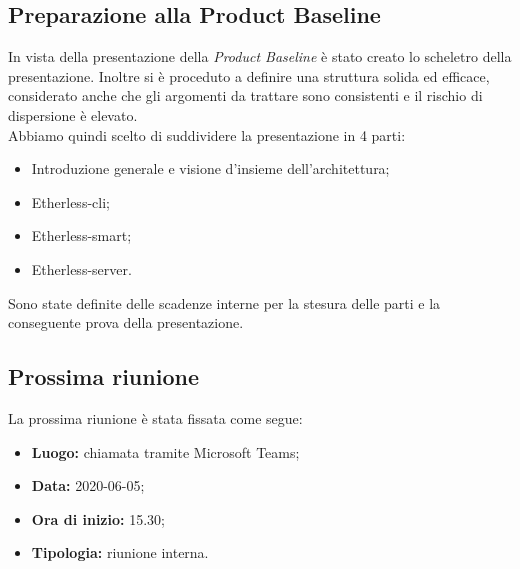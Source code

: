 	\subsection{Preparazione alla Product Baseline}
		In vista della presentazione della \textit{Product Baseline} è stato creato lo scheletro della presentazione. Inoltre si è proceduto a definire una struttura solida ed efficace, considerato anche che gli argomenti da trattare sono consistenti e il rischio di dispersione è elevato.\\
		Abbiamo quindi scelto di suddividere la presentazione in 4 parti:
		\begin{itemize}
			\item Introduzione generale e visione d'insieme dell'architettura;
			\item Etherless-cli;
			\item Etherless-smart;
			\item Etherless-server.
		\end{itemize}
		Sono state definite delle scadenze interne per la stesura delle parti e la conseguente prova della presentazione.
	
	\subsection{Prossima riunione}
		La prossima riunione è stata fissata come segue:
		\begin{itemize}
			\item \textbf{Luogo:} chiamata tramite Microsoft Teams; 
			\item \textbf{Data:} 2020-06-05;
			\item \textbf{Ora di inizio:} 15.30;
			\item \textbf{Tipologia:} riunione interna.
		\end{itemize}